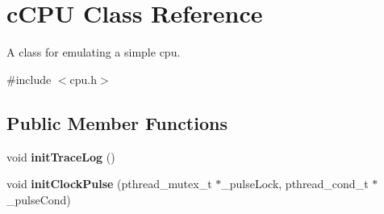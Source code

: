 \hypertarget{classcCPU}{\section{c\-C\-P\-U \-Class \-Reference}
\label{d2/dc6/classcCPU}
}


\-A class for emulating a simple cpu.  




{\ttfamily \#include $<$cpu.\-h$>$}

\subsection*{\-Public \-Member \-Functions}
\begin{DoxyCompactItemize}
\item 
\hypertarget{classcCPU_a8ed9b15ed0e8ae225eb821ac0974ced0}{void {\bfseries init\-Trace\-Log} ()}\label{d2/dc6/classcCPU_a8ed9b15ed0e8ae225eb821ac0974ced0}

\item 
\hypertarget{classcCPU_a09419d6cb8371336e123c9b5eb56487d}{void {\bfseries init\-Clock\-Pulse} (pthread\-\_\-mutex\-\_\-t $\ast$\-\_\-pulse\-Lock, pthread\-\_\-cond\-\_\-t $\ast$\-\_\-pulse\-Cond)}\label{d2/dc6/classcCPU_a09419d6cb8371336e123c9b5eb56487d}


\end{DoxyCompactItemize}
